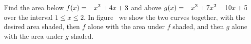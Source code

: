 \begin{example} Find the area below $\displaystyle f(x)= -x^2+4x+3$ and above
$\displaystyle g(x)=-x^3+7x^2-10x+5$ over the interval $1\le x\le2$. In
figure~ we show the two curves together, with
the desired area shaded, then $f$ alone with the area under $f$
shaded, and then $g$ alone with the area under $g$ shaded. 




\end{example}
